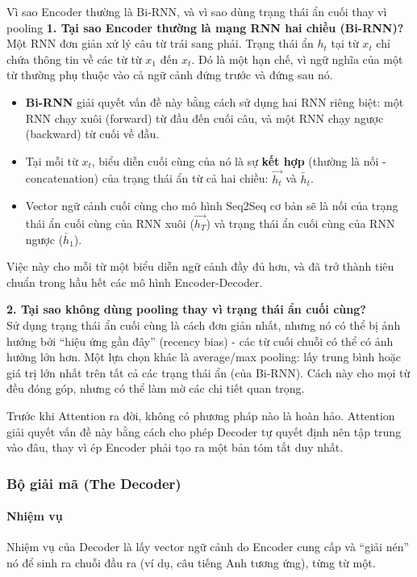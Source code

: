 \begin{deepdive}{Vì sao Encoder thường là Bi-RNN, và vì sao dùng trạng thái ẩn cuối thay vì pooling}
\textbf{1. Tại sao Encoder thường là mạng RNN hai chiều (Bi-RNN)?} \\
Một RNN đơn giản xử lý câu từ trái sang phải. Trạng thái ẩn $h_t$ tại từ $x_t$ chỉ chứa thông tin về các từ từ $x_1$ đến $x_t$. Đó là một hạn chế, vì ngữ nghĩa của một từ thường phụ thuộc vào cả ngữ cảnh đứng trước và đứng sau nó.
\begin{itemize}
    \item \textbf{Bi-RNN} giải quyết vấn đề này bằng cách sử dụng hai RNN riêng biệt: một RNN chạy xuôi (forward) từ đầu đến cuối câu, và một RNN chạy ngược (backward) từ cuối về đầu.
    \item Tại mỗi từ $x_t$, biểu diễn cuối cùng của nó là sự \textbf{kết hợp} (thường là nối - concatenation) của trạng thái ẩn từ cả hai chiều: $\overrightarrow{h_t}$ và $\overleftarrow{h_t}$.
    \item Vector ngữ cảnh cuối cùng cho mô hình Seq2Seq cơ bản sẽ là nối của trạng thái ẩn cuối cùng của RNN xuôi ($\overrightarrow{h_T}$) và trạng thái ẩn cuối cùng của RNN ngược ($\overleftarrow{h_1}$).
\end{itemize}
Việc này cho mỗi từ một biểu diễn ngữ cảnh đầy đủ hơn, và đã trở thành tiêu chuẩn trong hầu hết các mô hình Encoder-Decoder.

\textbf{2. Tại sao không dùng pooling thay vì trạng thái ẩn cuối cùng?} \\
Sử dụng trạng thái ẩn cuối cùng là cách đơn giản nhất, nhưng nó có thể bị ảnh hưởng bởi “hiệu ứng gần đây” (recency bias) - các từ cuối chuỗi có thể có ảnh hưởng lớn hơn. Một lựa chọn khác là average/max pooling: lấy trung bình hoặc giá trị lớn nhất trên tất cả các trạng thái ẩn (của Bi-RNN). Cách này cho mọi từ đều đóng góp, nhưng có thể làm mờ các chi tiết quan trọng.

Trước khi Attention ra đời, không có phương pháp nào là hoàn hảo. Attention giải quyết vấn đề này bằng cách cho phép Decoder tự quyết định nên tập trung vào đâu, thay vì ép Encoder phải tạo ra một bản tóm tắt duy nhất.
\end{deepdive}
\subsubsection{Bộ giải mã (The Decoder)}
\paragraph{Nhiệm vụ}
Nhiệm vụ của Decoder là lấy vector ngữ cảnh do Encoder cung cấp và “giải nén” nó để sinh ra chuỗi đầu ra (ví dụ, câu tiếng Anh tương ứng), từng từ một.

